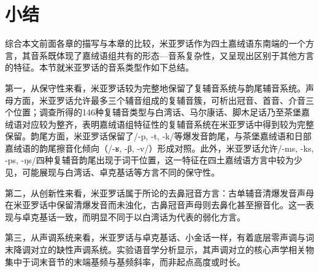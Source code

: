 \section{小结}

综合本文前面各章的描写与本章的比较，米亚罗话作为四土嘉绒语东南端的一个方言，其音系既体现了嘉绒语组共有的形态—音系复杂性，又呈现出区别于其他方言的特征。本节就米亚罗话的音系类型作如下总结。

第一，从保守性来看，米亚罗话较为完整地保留了复辅音系统与韵尾辅音系统。声母方面，米亚罗话允许最多三个辅音组成的复辅音簇，可析出冠音、首音、介音三个位置；调查所得的146种复辅音类型与白湾话、马尔康话、脚木足话乃至茶堡嘉绒语对应较为整齐，表明嘉绒语组特征性的复辅音系统在米亚罗话中得到较为完整保留。韵尾方面，米亚罗话保留了/-p, -t, -k/等爆发音韵尾，与茶堡嘉绒语和日部嘉绒语的韵尾擦音化倾向（/-ʁ, -β, -v/）形成对照。此外，米亚罗话允许/-ms, -ks, -ps, -ŋs/四种复辅音韵尾出现于词干位置，这一特征在四土嘉绒语方言中较为少见，可能展现与白湾话、卓克基话等方言不同的保守性。

第二，从创新性来看，米亚罗话属于\textcite{Gong2018-aw}所论的去鼻冠音方言：古单辅音清爆发音声母在米亚罗话中保留清爆发音而未浊化，古鼻冠音声母则去鼻化甚至擦音化。这一表现与卓克基话一致，而明显不同于以白湾话为代表的弱化方言。

第三，从声调系统来看，米亚罗话与卓克基话、小金话一样，有着底层零声调与词末降调对立的缺性声调系统。实验语音学分析显示，其声调对立的核心声学相关物集中于词末音节的末端基频与基频斜率，而非起点高度或时长。

